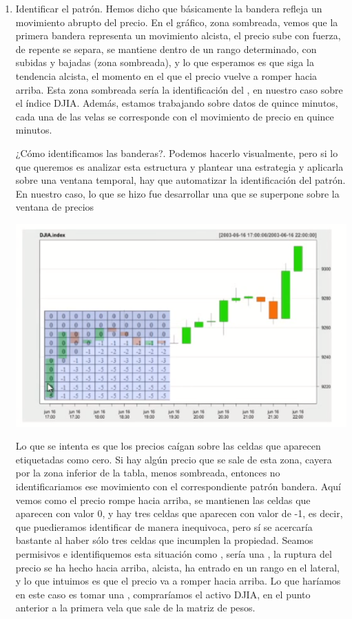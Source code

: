 \begin{enumerate}
    \item Identificar el patrón. Hemos dicho que básicamente la bandera  refleja un movimiento abrupto del precio. En el gráfico, zona sombreada, vemos que la primera bandera representa un movimiento alcista, el precio sube con fuerza, de repente se separa, se mantiene dentro de un rango determinado, con subidas y bajadas (zona sombreada), y lo que esperamos es que siga la tendencia alcista, el momento en el que el precio vuelve a romper hacia arriba. Esta zona sombreada sería la identificación del , en nuestro caso sobre el índice DJIA. Además, estamos trabajando sobre datos de quince minutos, cada una de las velas se corresponde con el movimiento de precio en quince minutos.
    
    ¿Cómo identificamos las banderas?. Podemos hacerlo visualmente, pero si lo que queremos es analizar esta estructura y plantear una estrategia y aplicarla sobre una ventana temporal, hay que automatizar la identificación del patrón. En nuestro caso, lo que se hizo fue desarrollar una  que se superpone sobre la ventana de precios

    \begin{center}
        \includegraphics[scale=.65]{images/mod03-13.png}
    \end{center}
    Lo que se intenta es que los precios caígan sobre las celdas que aparecen etiquetadas como cero. Si hay algún precio que se sale de esta zona, cayera por la zona inferior de la tabla, menos sombreada, entonces no identificariamos ese movimiento con el correspondiente patrón bandera. Aquí vemos como el precio rompe hacia arriba, se mantienen las celdas que aparecen con valor 0, y hay tres celdas que aparecen con valor de -1, es decir,  que puedieramos identificar de manera inequivoca, pero sí se acercaría bastante al haber sólo tres celdas que incumplen la propiedad. Seamos permisivos e identifiquemos esta situación como , sería una , la ruptura del precio se ha hecho hacia arriba, alcista, ha entrado en un rango en el lateral, y lo que intuimos es que el precio va a romper hacia arriba. Lo que haríamos en este caso es tomar una , compraríamos el activo DJIA, en el punto anterior a la primera vela que sale de la matriz de pesos.


\end{enumerate}
